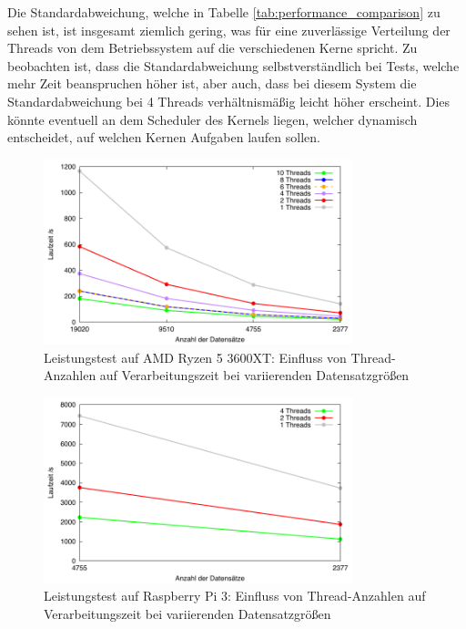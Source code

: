 Die Standardabweichung, welche in Tabelle \ref{tab:performance_comparison} zu sehen ist, ist insgesamt ziemlich gering, was für eine zuverlässige Verteilung der Threads von dem Betriebssystem  auf die verschiedenen Kerne spricht. Zu beobachten ist, dass die Standardabweichung selbstverständlich bei Tests, welche mehr Zeit beanspruchen höher ist, aber auch, dass bei diesem System die Standardabweichung bei 4 Threads verhältnismäßig leicht höher erscheint. Dies könnte eventuell an dem Scheduler des Kernels liegen, welcher dynamisch entscheidet, auf welchen Kernen Aufgaben laufen sollen.

\begin{figure}[H]
\centering
\includegraphics[width=0.8\textwidth]{../results/plots/3600xt/comp_all_threads.pdf}
\caption{Leistungstest auf AMD Ryzen 5 3600XT: Einfluss von Thread-Anzahlen auf Verarbeitungszeit bei variierenden Datensatzgrößen}
\label{fig:ryzen_benchmark_threads}
\end{figure}

\begin{figure}[H]
\centering
\includegraphics[width=0.8\textwidth]{../results/plots/raspberrypi3/comp_all_threads.pdf}
\caption{Leistungstest auf Raspberry Pi 3: Einfluss von Thread-Anzahlen auf Verarbeitungszeit bei variierenden Datensatzgrößen}
\label{fig:raspi_benchmark_threads}
\end{figure}


